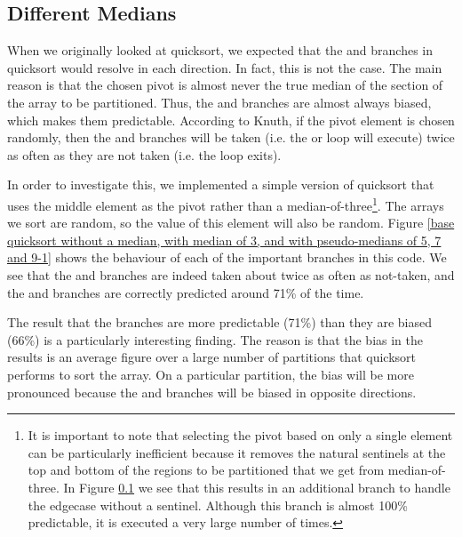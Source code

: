 \subsection{Different Medians}

\label{quick-predictors2}

\label{quicksort entropy}
When we originally looked at quicksort, we expected that the  and 
branches in quicksort would resolve in each direction. In fact, this is not the
case. The main reason is that the chosen pivot is almost never the true median
of the section of the array to be partitioned. Thus, the  and 
branches are almost always biased, which makes them predictable. According to
Knuth, if the pivot element is chosen randomly, then the  and 
branches will be taken (i.e.  the  or  loop will execute) twice as
often as they are not taken (i.e. the loop exits).

In order to investigate this, we implemented a simple version of quicksort that
uses the middle element as the pivot rather than a median-of-three\footnote{It
is important to note that selecting the pivot based on only a single element can
be particularly inefficient because it removes the natural sentinels at the top
and bottom of the regions to be partitioned that we get from median-of-three. In
Figure \ref{quick-predictors2} we see that this results in an additional branch
to handle the edgecase without a sentinel. Although this branch is almost 100\%
predictable, it is executed a very large number of times.}. The arrays we sort
are random, so the value of this element will also be random. Figure \ref{base
quicksort without a median, with median of 3, and with pseudo-medians of 5, 7
and 9-1} shows the behaviour of each of the important branches in this code. We
see that the  and  branches are indeed taken about twice as often as
not-taken, and the  and  branches are correctly predicted around 71\%
of the time.

The result that the branches are more predictable (71\%) than they are biased
(66\%) is a particularly interesting finding. The reason is that the bias in the
results is an average figure over a large number of partitions that quicksort
performs to sort the array. On a particular partition, the bias will be more
pronounced because the  and  branches will be biased in opposite
directions.

